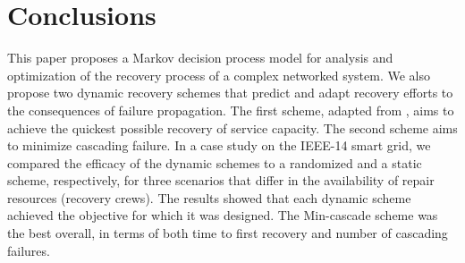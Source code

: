 \documentclass[runningheads]{llncs}
\begin{document}
\section{Conclusions}
This paper proposes a Markov decision process model for analysis and optimization of the recovery process of a complex networked system. We also propose two dynamic recovery schemes that predict and adapt recovery efforts to the consequences of failure propagation. The first scheme, adapted from \cite{yan_dynamic_2021}, aims to achieve the quickest possible recovery of service capacity. The second scheme aims to minimize cascading failure.  In a case study on the IEEE-14 smart grid, we compared the efficacy of the dynamic schemes to a randomized and a static scheme, respectively, for three scenarios that differ in the availability of repair resources (recovery crews). The results showed that each dynamic scheme achieved the objective for which it was designed. The Min-cascade scheme was the best overall, in terms of both time to first recovery and number of cascading failures. 

\end{document}
